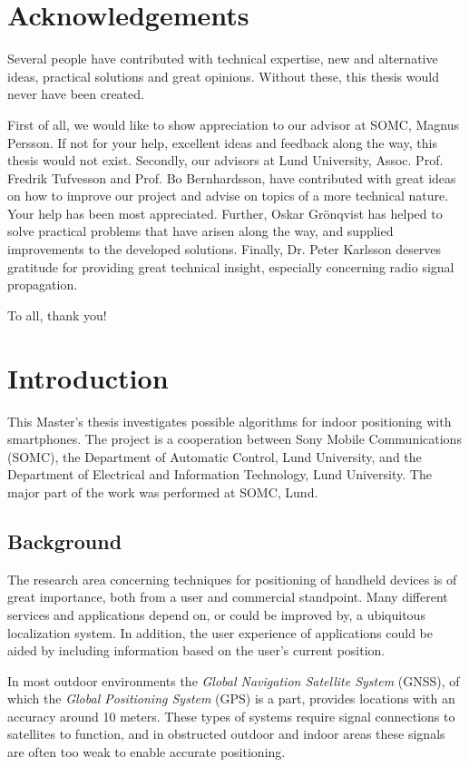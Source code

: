\documentclass{LTHthesis}
\begin{document}
\chapter*{Acknowledgements}
Several people have contributed with technical expertise, new and alternative ideas, practical solutions and great opinions. Without these, this thesis would never have been created. 

First of all, we would like to show appreciation to our advisor at SOMC, Magnus Persson. If not for your help, excellent ideas and feedback along the way, this thesis would not exist. Secondly, our advisors at Lund University, Assoc. Prof. Fredrik Tufvesson and Prof. Bo Bernhardsson, have contributed with great ideas on how to improve our project and advise on topics of a more technical nature. Your help has been most appreciated. Further, Oskar Gr\"{o}nqvist has helped to solve practical problems that have arisen along the way, and supplied improvements to the developed solutions. Finally, Dr. Peter Karlsson deserves gratitude for providing great technical insight, especially concerning radio signal propagation.     

To all, thank you!
\tableofcontents
\chapter{Introduction}

This Master's thesis investigates possible algorithms for indoor positioning with smartphones. The project is a cooperation between Sony Mobile Communications (SOMC), the Department of Automatic Control, Lund University, and the Department of Electrical and Information Technology, Lund University. The major part of the work was performed at SOMC, Lund.

\section{Background}
%
The research area concerning techniques for positioning of handheld devices is of great importance, both from a user and commercial standpoint. Many different services and applications depend on, or could be improved by, a ubiquitous localization system. In addition, the user experience of applications could be aided by including information based on the user's current position. %
  
In most outdoor environments the \emph{Global Navigation Satellite System} (GNSS), of which the \emph{Global Positioning System} (GPS) is a part, provides locations with an accuracy around 10 meters. These types of systems require signal connections to satellites to function, and in obstructed outdoor and indoor areas these signals are often too weak to enable accurate positioning. 
\end{document}
